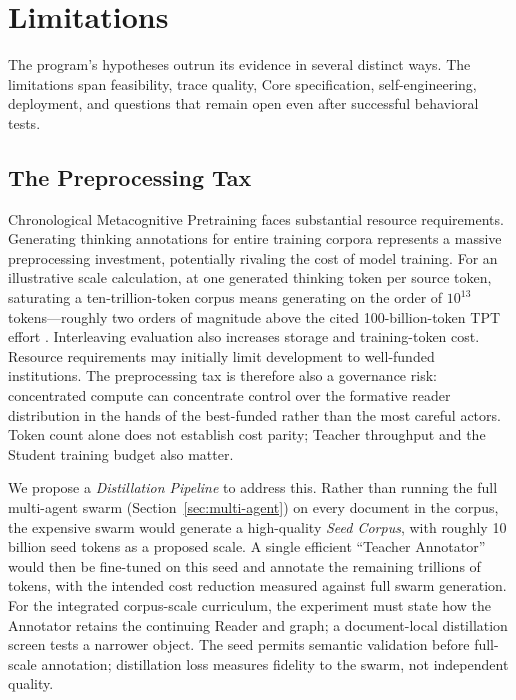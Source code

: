 \section{Limitations}\label{sec:limitations}

The program's hypotheses outrun its evidence in several distinct ways. The limitations span feasibility, trace quality, Core specification, self-engineering, deployment, and questions that remain open even after successful behavioral tests.

\subsection{The Preprocessing Tax}

Chronological Metacognitive Pretraining faces substantial resource requirements.
Generating thinking annotations for entire training corpora represents a massive
preprocessing investment, potentially rivaling the cost of model training. For an illustrative scale calculation, at
one generated thinking token per source token, saturating a
ten-trillion-token corpus means generating on the order of $10^{13}$
tokens---roughly two orders of magnitude above the cited 100-billion-token TPT
effort \cite{nvidia2025tpt}. Interleaving evaluation also increases storage and
training-token cost. Resource requirements may initially limit development to
well-funded institutions. The preprocessing tax is therefore also a governance
risk: concentrated compute can concentrate control over the formative reader
distribution in the hands of the best-funded rather than the most careful
actors. Token count alone does not establish cost parity; Teacher throughput and the Student training budget also matter.

We propose a \emph{Distillation Pipeline} to address this. Rather than running the full multi-agent swarm (Section~\ref{sec:multi-agent}) on every document in the corpus, the expensive swarm would generate a high-quality \emph{Seed Corpus}, with roughly 10 billion seed tokens as a proposed scale. A single efficient ``Teacher Annotator'' would then be fine-tuned on this seed and annotate the remaining trillions of tokens, with the intended cost reduction measured against full swarm generation. For the integrated corpus-scale curriculum, the experiment must state how the Annotator retains the continuing Reader and graph; a document-local distillation screen tests a narrower object. The seed permits semantic validation before full-scale annotation; distillation loss measures fidelity to the swarm, not independent quality.

